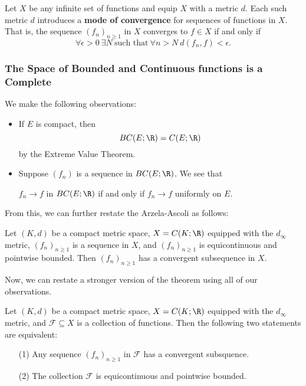 Let \( X \) be any infinite set of functions and equip \( X  \) with a metric \( d \). Each such metric \( d \) introduces a \textbf{mode of convergence} for sequences of functions in \( X  \). That is, the sequence \( ({f}_{n})_{n \geq 1 } \) in \( X  \) converges to \( f \in X  \) if and only if
\[  \forall \epsilon  > 0 \ \exists N \ \text{such that} \ \forall n > N \ d({f}_{n}, f) < \epsilon.   \]

\subsubsection{The Space of Bounded and Continuous functions is a Complete}

We make the following observations:

\begin{itemize}
    \item If \( E  \) is compact, then 
        \[ BC(E ; \R ) = C (E ; \R )  \]
        by the Extreme Value Theorem.
    \item Suppose \( ({f}_{n})  \) is a sequence in \( BC(E;\R) \). We see that  
        \begin{center}
            \( {f}_{n} \to f  \) in \( BC(E;\R) \) if and only if \( {f}_{n} \to f  \) uniformly on \( E  \).
        \end{center}
\end{itemize} 

From this, we can further restate the Arzela-Ascoli as follows:

\begin{theorem}
    Let \( (K,d) \) be a compact metric space, \( X = C(K ; \R ) \) equipped with the \( {d}_{\infty } \) metric, \( ({f}_{n})_{n \geq 1} \) is a sequence in \( X  \), and \( ({f}_{n})_{n \geq 1}  \) is equicontinuous and pointwise bounded. Then \( ({f}_{n})_{n \geq 1 } \) has a convergent subsequence in \( X  \).
\end{theorem}

Now, we can restate a stronger version of the theorem using all of our observations.

\begin{theorem}
    Let \( (K,d) \) be a compact metric space, \( X = C(K;\R) \) equipped with the \( {d}_{\infty } \) metric, and \( \mathcal{F} \subseteq  X  \) is a collection of functions. Then the following two statements are equivalent:
    \begin{enumerate}
        \item[(1)] Any sequence \( ({f}_{n})_{n \geq 1}  \) in \( \mathcal{F} \) has a convergent subsquence.
        \item[(2)] The collection \( \mathcal{F} \) is equicontinuous and pointwise bounded.
    \end{enumerate}
\end{theorem}

